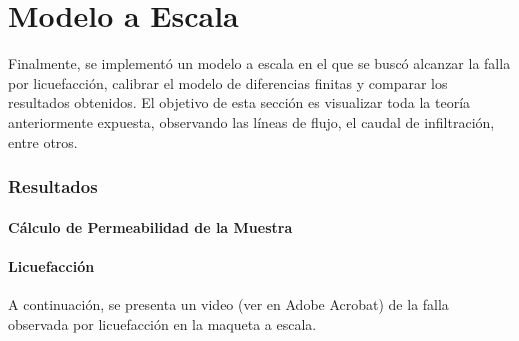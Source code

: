 \part{Modelo a Escala}

Finalmente, se implementó un modelo a escala en el que se buscó alcanzar la falla por licuefacción, calibrar el modelo de diferencias finitas y comparar los resultados obtenidos. El objetivo de esta sección es visualizar toda la teoría anteriormente expuesta, observando las líneas de flujo, el caudal de infiltración, entre otros.

\section{Resultados}

\subsection{Cálculo de Permeabilidad de la Muestra}

\subsection{Licuefacción}

A continuación, se presenta un video (ver en Adobe Acrobat) de la falla observada por licuefacción en la maqueta a escala.

